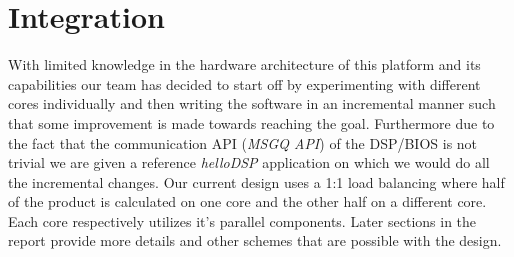 \section{Integration}
With limited knowledge in the hardware architecture of this platform and its capabilities our team has decided to start off by experimenting with different cores individually and then writing the software in an incremental manner such that some improvement is made towards reaching the goal. Furthermore due to the fact that the communication API (\emph{MSGQ API}) of the DSP/BIOS is not trivial we are given a reference \emph{helloDSP} application on which we would do all the incremental changes.
Our current design uses a 1:1 load balancing where half of the product is calculated on one core and the other half on a different core. Each core respectively utilizes it's parallel components. Later sections in the report provide more details and other schemes that are possible with the design.